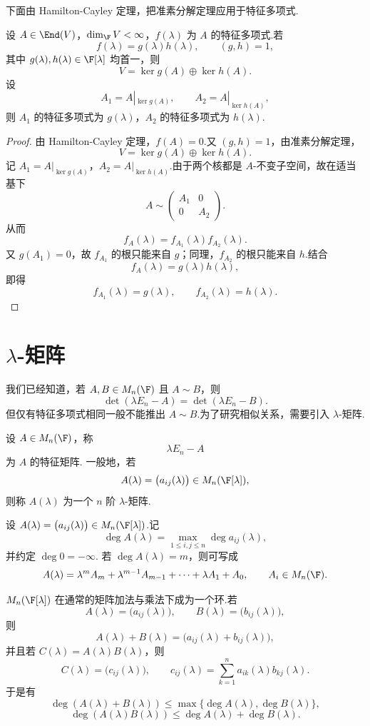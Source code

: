 下面由 Hamilton-Cayley 定理，把准素分解定理应用于特征多项式.

\begin{example}
设 $A\in\End(V)$，$\dim_{\F}V<\infty$，$f(\lambda)$ 为 $A$ 的特征多项式.若
\[
f(\lambda)=g(\lambda)h(\lambda),
\qquad (g,h)=1,
\]
其中 $g(\lambda),h(\lambda)\in\F[\lambda]$ 均首一，则
\[
V=\ker g(A)\oplus\ker h(A).
\]
设
\[
A_1=A|_{\ker g(A)},
\qquad
A_2=A|_{\ker h(A)},
\]
则 $A_1$ 的特征多项式为 $g(\lambda)$，$A_2$ 的特征多项式为 $h(\lambda)$.
\end{example}

\begin{proof}
由 Hamilton-Cayley 定理，$f(A)=0$.又 $(g,h)=1$，由准素分解定理，
\[
V=\ker g(A)\oplus\ker h(A).
\]
记 $A_1=A|_{\ker g(A)}$，$A_2=A|_{\ker h(A)}$.由于两个核都是 $A$-不变子空间，故在适当基下
\[
A\sim \begin{pmatrix}
A_1&0\\
0&A_2
\end{pmatrix}.
\]
从而
\[
f_A(\lambda)=f_{A_1}(\lambda)f_{A_2}(\lambda).
\]
又 $g(A_1)=0$，故 $f_{A_1}$ 的根只能来自 $g$；同理，$f_{A_2}$ 的根只能来自 $h$.结合
\[
f_A(\lambda)=g(\lambda)h(\lambda),
\]
即得
\[
f_{A_1}(\lambda)=g(\lambda),
\qquad
f_{A_2}(\lambda)=h(\lambda).
\]
\end{proof}
\section{$\lambda$-矩阵}

我们已经知道，若 $A,B\in M_n(\F)$ 且 $A\sim B$，则
\[
\det(\lambda E_n-A)=\det(\lambda E_n-B).
\]
但仅有特征多项式相同一般不能推出 $A\sim B$.为了研究相似关系，需要引入 $\lambda$-矩阵.

\begin{definition}\label{p1:concept:c5-l1709}
	设 $A\in M_n(\F)$，称
	\[
	\lambda E_n-A
	\]
	为 $A$ 的特征矩阵.
	一般地，若
	\[
	A(\lambda)=\bigl(a_{ij}(\lambda)\bigr)\in M_n(\F[\lambda]),
	\]
	则称 $A(\lambda)$ 为一个 $n$ 阶 $\lambda$-矩阵.
\end{definition}

设 $A(\lambda)=\bigl(a_{ij}(\lambda)\bigr)\in M_n(\F[\lambda])$.记
\[
\deg A(\lambda)=\max_{1\leq i,j\leq n}\deg a_{ij}(\lambda),
\]
并约定 $\deg0=-\infty$.
若 $\deg A(\lambda)=m$，则可写成
\[
A(\lambda)=\lambda^mA_m+\lambda^{m-1}A_{m-1}+\cdots+\lambda A_1+A_0,
\qquad A_i\in M_n(\F).
\]

$M_n(\F[\lambda])$ 在通常的矩阵加法与乘法下成为一个环.若
\[
A(\lambda)=\bigl(a_{ij}(\lambda)\bigr),
\qquad
B(\lambda)=\bigl(b_{ij}(\lambda)\bigr),
\]
则
\[
A(\lambda)+B(\lambda)=\bigl(a_{ij}(\lambda)+b_{ij}(\lambda)\bigr),
\]
并且若 $C(\lambda)=A(\lambda)B(\lambda)$，则
\[
C(\lambda)=\bigl(c_{ij}(\lambda)\bigr),
\qquad
c_{ij}(\lambda)=\sum_{k=1}^n a_{ik}(\lambda)b_{kj}(\lambda).
\]
于是有
\[
\deg(A(\lambda)+B(\lambda))\leq \max\{\deg A(\lambda),\deg B(\lambda)\},
\]
\[
\deg(A(\lambda)B(\lambda))\leq \deg A(\lambda)+\deg B(\lambda).
\]


